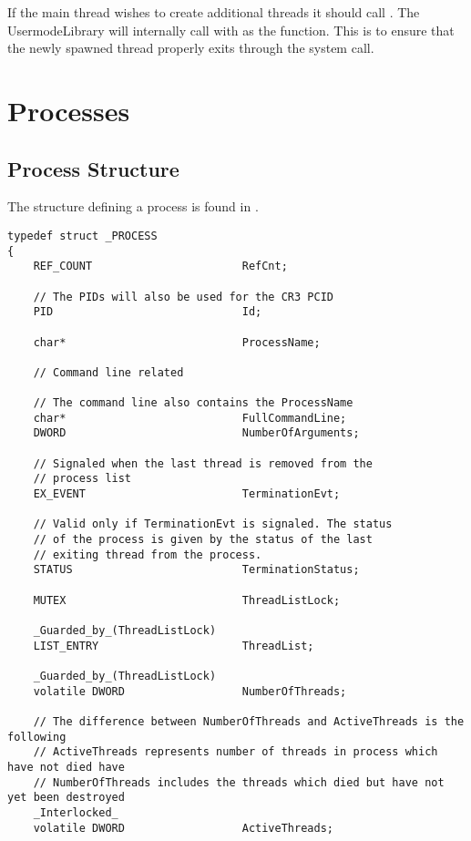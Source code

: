 \begin{appendices}
If the main thread wishes to create additional threads it should call . The
UsermodeLibrary will internally call  with  as the
function. This is to ensure that the newly spawned thread properly exits through the
 system call.

\section{Processes}
\label{sect:Processes}

\subsection{Process Structure}

The structure defining a process is found in .

\begin{lstlisting}[caption={Process Structure},label={lst:ProcessStruct}]
typedef struct _PROCESS
{
    REF_COUNT                       RefCnt;

    // The PIDs will also be used for the CR3 PCID
    PID                             Id;

    char*                           ProcessName;

    // Command line related

    // The command line also contains the ProcessName
    char*                           FullCommandLine;
    DWORD                           NumberOfArguments;

    // Signaled when the last thread is removed from the
    // process list
    EX_EVENT                        TerminationEvt;

    // Valid only if TerminationEvt is signaled. The status
    // of the process is given by the status of the last
    // exiting thread from the process.
    STATUS                          TerminationStatus;

    MUTEX                           ThreadListLock;

    _Guarded_by_(ThreadListLock)
    LIST_ENTRY                      ThreadList;

    _Guarded_by_(ThreadListLock)
    volatile DWORD                  NumberOfThreads;

    // The difference between NumberOfThreads and ActiveThreads is the following
    // ActiveThreads represents number of threads in process which have not died have
    // NumberOfThreads includes the threads which died but have not yet been destroyed
    _Interlocked_
    volatile DWORD                  ActiveThreads;


\end{lstlisting}
\end{appendices}
